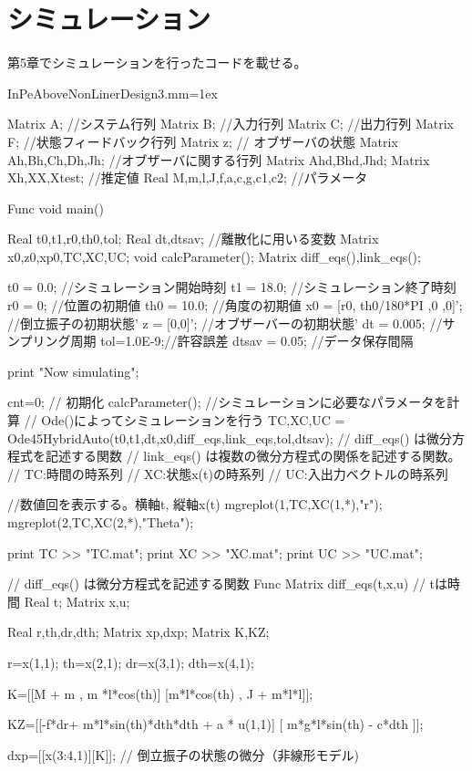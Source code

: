\section{シミュレーション}
	第5章でシミュレーションを行ったコードを載せる。
	\begin{breakitembox}[l]{InPeAboveNonLinerDesign3.mm}\baselineskip=1ex
		\begin{verbatimtab}[4]
Matrix A; //システム行列
Matrix B; //入力行列
Matrix C; //出力行列
Matrix F; //状態フィードバック行列
Matrix z; // オブザーバの状態
Matrix Ah,Bh,Ch,Dh,Jh; //オブザーバに関する行列
Matrix Ahd,Bhd,Jhd;
Matrix Xh,XX,Xtest; //推定値
Real M,m,l,J,f,a,c,g,c1,c2; //パラメータ

Func void main()
{
	Real t0,t1,r0,th0,tol;
	Real dt,dtsav; //離散化に用いる変数
	Matrix x0,z0,xp0,TC,XC,UC;
	void calcParameter();
	Matrix diff_eqs(),link_eqs();
	
	t0 = 0.0; //シミュレーション開始時刻
	t1 = 18.0; //シミュレーション終了時刻
	r0 = 0; //位置の初期値
	th0 = 10.0; //角度の初期値
	x0 = [r0, th0/180*PI ,0 ,0]'; //倒立振子の初期状態'
	z = [0,0]'; //オブザーバーの初期状態'
	dt = 0.005; //サンプリング周期
	tol=1.0E-9;//許容誤差
	dtsav = 0.05; //データ保存間隔
	
	print "Now simulating\n";
	
	cnt=0; // 初期化
    calcParameter(); //シミュレーションに必要なパラメータを計算
	// Ode()によってシミュレーションを行う
	{TC,XC,UC} =
	 Ode45HybridAuto(t0,t1,dt,x0,diff_eqs,link_eqs,tol,dtsav);
	// diff_eqs() は微分方程式を記述する関数
	// link_eqs() は複数の微分方程式の関係を記述する関数。
	// TC:時間の時系列
	// XC:状態x(t)の時系列
	// UC:入出力ベクトルの時系列
	
	//数値回を表示する。横軸t, 縦軸x(t)
	mgreplot(1,TC,XC(1,*),{"r"});
	mgreplot(2,TC,XC(2,*),{"Theta"});
	
	print TC >> "TC.mat";
	print XC >> "XC.mat";
	print UC >> "UC.mat";
}



// diff_eqs() は微分方程式を記述する関数
Func Matrix diff_eqs(t,x,u)
// tは時間
Real t;
Matrix x,u;
{
	Real r,th,dr,dth;
	Matrix xp,dxp;
	Matrix K,KZ;
	
	r=x(1,1);
	th=x(2,1);
	dr=x(3,1);
	dth=x(4,1);

	K=[[M + m , m *l*cos(th)]
	   [m*l*cos(th) , J + m*l*l]];

	KZ=[[-f*dr+ m*l*sin(th)*dth*dth + a * u(1,1)]
		[ m*g*l*sin(th) - c*dth ]];
	
	dxp=[[x(3:4,1)][K\KZ]]; // 倒立振子の状態の微分（非線形モデル)
	
}
\end{verbatimtab}
\end{breakitembox}
